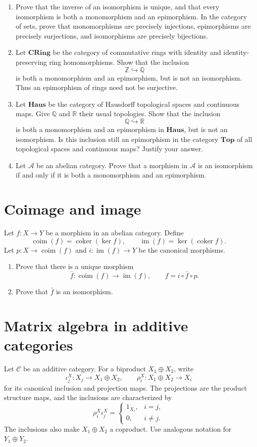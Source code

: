 \documentclass[11pt]{article}
\DeclareMathOperator{\im}{im}
\DeclareMathOperator{\coim}{coim}
\DeclareMathOperator{\coker}{coker}
\newcommand{\Z}{\mathbb{Z}}
\newcommand{\Q}{\mathbb{Q}}
\newcommand{\R}{\mathbb{R}}
\begin{document}
\begin{enumerate}
\item Prove that the inverse of an isomorphism is unique, and that every
isomorphism is both a monomorphism and an epimorphism. In the category of
sets, prove that monomorphisms are precisely injections, epimorphisms are
precisely surjections, and isomorphisms are precisely bijections.

\item Let \(\mathbf{CRing}\) be the category of commutative rings with
identity and identity-preserving ring homomorphisms. Show that the inclusion
\[
\Z\hookrightarrow\Q
\]
is both a monomorphism and an epimorphism, but is not an isomorphism. Thus
an epimorphism of rings need not be surjective.

\item Let \(\mathbf{Haus}\) be the category of Hausdorff topological spaces
and continuous maps. Give \(\Q\) and \(\R\) their usual topologies. Show
that the inclusion
\[
\Q\hookrightarrow\R
\]
is both a monomorphism and an epimorphism in \(\mathbf{Haus}\), but is not
an isomorphism. Is this inclusion still an epimorphism in the category
\(\mathbf{Top}\) of all topological spaces and continuous maps? Justify
your answer.

\item Let \(\mathcal A\) be an abelian category. Prove that a morphism
in \(\mathcal A\) is an isomorphism if and only if it is both a
monomorphism and an epimorphism.
\end{enumerate}

\section{Coimage and image}
Let \(f:X\to Y\) be a morphism in an abelian category. Define
\[
\coim(f)=\coker(\ker f),
\qquad
\im(f)=\ker(\coker f).
\]
Let \(p:X\to\coim(f)\) and \(i:\im(f)\to Y\) be the canonical morphisms.
\begin{enumerate}
\item Prove that there is a unique morphism
\[
\bar{f}:\coim(f)\longrightarrow\im(f),
\qquad
f=i\circ\bar{f}\circ p.
\]
\item Prove that \(\bar{f}\) is an isomorphism.
\end{enumerate}

\section{Matrix algebra in additive categories}
Let \(\mathcal C\) be an additive category. For a biproduct
\(X_1\oplus X_2\), write
\[
\iota_j^X:X_j\longrightarrow X_1\oplus X_2,
\qquad
\rho_i^X:X_1\oplus X_2\longrightarrow X_i
\]
for its canonical inclusion and projection maps. The projections are the
product structure maps, and the inclusions are characterized by
\[
\rho_i^X\iota_j^X=
\begin{cases}
1_{X_i},&i=j,\\
0,&i\ne j.
\end{cases}
\]
The inclusions also make \(X_1\oplus X_2\) a coproduct. Use analogous
notation for \(Y_1\oplus Y_2\).
\end{document}
